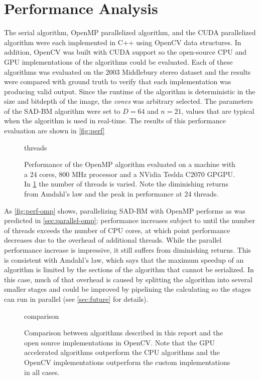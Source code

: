 \documentclass{article}
\let\orgautoref\autoref
\providecommand{\Cref}
        {\def\equationautorefname{Equation}%
         \def\figureautorefname{Figure}%
         \def\subfigureautorefname{Figure}%
         \def\Itemautorefname{Item}%
         \def\tableautorefname{Table}%
         \def\sectionautorefname{Section}%
         \def\subsectionautorefname{Section}%
         \def\subsubsectionautorefname{Section}%
         \def\chapterautorefname{Section}%
         \def\partautorefname{Part}%
         \orgautoref}
\begin{document}
\section{Performance Analysis}
\label{sec:perf}
The serial algorithm, OpenMP parallelized algorithm, and the CUDA parallelized
algorithm were each implemented in C++ using OpenCV data structures. In
addition, OpenCV was built with CUDA support so the open-source CPU and GPU
implementations of the algorithms could be evaluated. Each of these algorithms
was evaluated on the 2003 Middlebury stereo dataset and the results were
compared with ground truth to verify that each implementation was producing
valid output. Since the runtime of the algorithm is deterministic in the size
and bitdepth of the image, the \textit{cones} was arbitrary selected. The
parameters of the SAD-BM algorithm were set to $D = 64$ and $n = 21$, values
that are typical when the algorithm is used in real-time. The results of this
performance evaluation are shown in \Cref{fig:perf}

\begin{figure}
    \centering
    {threads}
    \caption{
        Performance of the OpenMP algorithm evaluated on a machine with a 24
        cores, 800 MHz processor and a NVidia Teslda C2070 GPGPU. In
        \ref{fig:perf-omp} the number of threads is varied. Note the
        diminishing returns from Amdahl's law and the peak in performance at 24
        threads.
    }
    \label{fig:perf-omp}
\end{figure}

As \Cref{fig:perf-omp} shows, parallelizing SAD-BM with OpenMP performs as
was predicted in \Cref{sec:parallel-omp}; performance increases subject to
until the number of threads exceeds the number of CPU cores, at which point
performance decreases due to the overhead of additional threads. While the
parallel performance increase is impressive, it still suffers from diminishing
returns. This is consistent with Amdahl's law, which says that the maximum
speedup of an algorithm is limited by the sections of the algorithm that cannot
be serialized. In this case, much of that overhead is caused by splitting the
algorithm into several smaller stages and could be improved by pipelining the
calculating so the stages can run in parallel (see \Cref{sec:future} for
details).

\begin{figure}
    \centering
    {comparison}
    \caption{
        Comparison between algorithms described in this report and the open
        source implementations in OpenCV. Note that the GPU accelerated
        algorithms outperform the CPU algorithms and the OpenCV implementations
        outperform the custom implementations in all cases.
    }
    \label{fig:perf-comp}
\end{figure}
\end{document}
